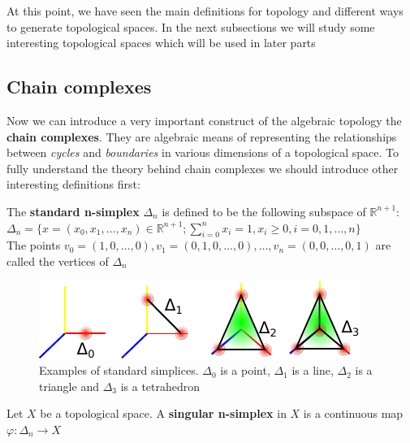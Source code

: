 At this point, we have seen the main definitions for topology and different ways to generate topological spaces. In the next subsections we will study some interesting topological spaces which will be used in later parts

\subsection{Chain complexes}

Now we can introduce a very important construct of the algebraic topology the \textbf{chain complexes}. They are algebraic means of representing the relationships between \textit{cycles} and \textit{boundaries} in various dimensions of a topological space. To fully understand the theory behind chain complexes we should introduce other interesting definitions first:

\begin{definition}
 The \textbf{standard n-simplex} $\Delta_{n}$ is defined to be the following subspace of $\mathbb{R}^{n+1}$:\\
 $\Delta_{n} = \{ x=(x_{0},x_{1},\dots,x_{n}) \in \mathbb{R}^{n+1}; \displaystyle\sum_{i=0}^{n} x_{i} = 1, x_{i} \geq 0, i = 0,1,\dots,n \}$\\
 The points $v_{0} = (1,0,\dots,0), v_{1} = (0,1,0,\dots,0),\dots, v_{n} = (0,0,\dots,0,1)$ are called the vertices of $\Delta_{n}$
\end{definition}

\begin{figure}[htb] %
   \centering
   \includegraphics[width=0.80\linewidth]{images/standardSimplices.pdf}
   \caption[Examples of standard n-simplices]{Examples of standard simplices. $\Delta_{0}$ is a point, $\Delta_{1}$ is a line, $\Delta_{2}$ is a triangle and $\Delta_{3}$ is a tetrahedron}
   \label{fig:standardSimplex}
\end{figure}

\begin{definition}
 Let $X$ be a topological space. A \textbf{singular n-simplex} in $X$ is a continuous map $\varphi \colon \Delta_{n} \rightarrow X$
\end{definition}

